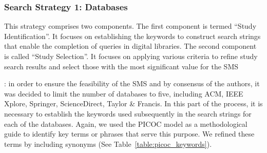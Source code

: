 
\newcommand{\acm}{518}
\newcommand{\ieee}{0}
\newcommand{\sd}{120}
\newcommand{\spr}{209}
\newcommand{\tf}{0}
\newcommand{\tot}{847}
\newcommand{\acmp}{\fpeval{round(\acm*100/\tot,2)}}
\newcommand{\ieeep}{\fpeval{round(\ieee*100/\tot,2)}}
\newcommand{\sdp}{\fpeval{round(\sd*100/\tot,2)}}
\newcommand{\sprp}{\fpeval{round(\spr*100/\tot,2)}}
\newcommand{\tfp}{\fpeval{round(\tf*100/\tot,2)}}


\newcommand{\iacm}{315}
\newcommand{\iieee}{0}
\newcommand{\isd}{101}
\newcommand{\ispr}{63}
\newcommand{\itf}{0}
\newcommand{\itot}{479}
\newcommand{\iacmp}{\fpeval{round(\iacm*100/\itot,2)}}
\newcommand{\iieeep}{\fpeval{round(\iieee*100/\itot,2)}}
\newcommand{\isdp}{\fpeval{round(\isd*100/\itot,2)}}
\newcommand{\isprp}{\fpeval{round(\ispr*100/\itot,2)}}
\newcommand{\itfp}{\fpeval{round(\itf*100/\itot,2)}}

\newcommand{\numEstEx}{3}

\newcommand{\depTot}{\fpeval{\itot-\numEstEx}}

\newcommand{\screen}{377}
\newcommand{\screenTot}{\fpeval{\depTot-\screen}}

\subsubsection{Search Strategy 1: Databases}

This strategy comprises two components. The first component is termed ``Study Identification''. It focuses on establishing the keywords to construct search strings that enable the completion of queries in digital libraries. The second component is called ``Study Selection''. It focuses on applying various criteria to refine study search results and select those with the most significant value for the SMS\@

: in order to ensure the feasibility of the SMS and by consensus of the authors, it was decided to limit the number of databases to five, including ACM, IEEE Xplore, Springer, ScienceDirect, Taylor \& Francis. In this part of the process, it is necessary to establish the keywords used subsequently in the search strings for each of the databases. Again, we used the PICOC model as a methodological guide to identify key terms or phrases that serve this purpose. We refined these terms by including synonyms (See Table~\ref{table:picoc_keywords}).

